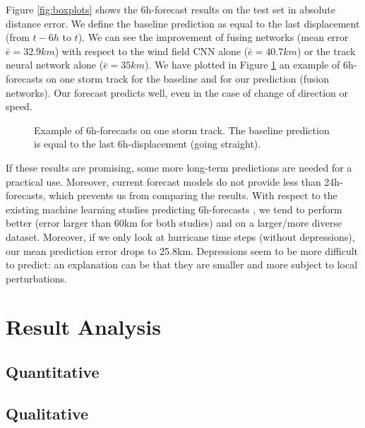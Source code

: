 Figure \ref{fig:boxplots} shows the 6h-forecast results on the test set in absolute distance error. We define the baseline prediction as equal to the last displacement (from $t-6h$ to $t$). We can see the improvement of fusing networks (mean error $\bar{e}=32.9km$) with respect to the wind field CNN alone ($\bar{e}=40.7km$) or the track neural network alone ($\bar{e}=35km$).
We have plotted in Figure \ref{fig:track} an example of 6h-forecasts on one storm track for the baseline and for our prediction (fusion networks). Our forecast predicts well, even in the case of change of direction or speed.


\begin{figure}
	\begin{center}
		\hsize {}
	\end{center}
	\caption{Example of 6h-forecasts on one storm track. The baseline prediction is equal to the last 6h-displacement (going straight).}
	\label{fig:track}
\end{figure}


If these results are promising, some more long-term predictions are needed for a practical use. Moreover, current forecast models do not provide less than 24h-forecasts, which prevents us from comparing the results. With respect to the existing machine learning studies predicting 6h-forecasts \cite{liberge2011prevision,moradi2016sparse}, we tend to perform better (error larger than 60km for both studies) and on a larger/more diverse dataset. Moreover, if we only look at hurricane time steps (without depressions), our mean prediction error drops to 25.8km. Depressions seem to be more difficult to predict: an explanation can be that they are smaller and more subject to local perturbations.

\section{Result Analysis}
\subsection{Quantitative}

\subsection{Qualitative}


